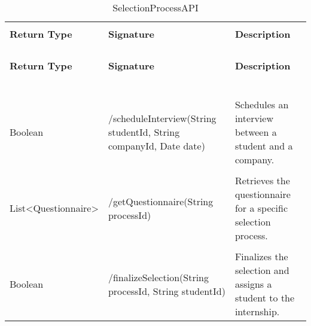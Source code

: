 \begin{longtable}{p{}p{}p{}}
    \caption{SelectionProcessAPI}
    \vspace{0.5em}\\
    \hline
    \vspace{0.5em}\\
    \textbf{Return Type} & \textbf{Signature} & \textbf{Description} \\
    \vspace{0.5em}\\
    \hline
    \vspace{0.5em}\\
    \endfirsthead
    \vspace{0.5em}\\
    \hline
    \vspace{0.5em}\\
    \textbf{Return Type} & \textbf{Signature} & \textbf{Description} \\
    \vspace{0.5em}\\
    \hline
    \vspace{0.5em}\\
    \endhead
    
    \vspace{0.5em}\\
    \hline
    \vspace{0.5em}\\
    \endfoot
    
    \vspace{0.5em}\\
    \hline
    \vspace{0.5em}\\
    \endlastfoot
    
    Boolean &
    /scheduleInterview(String studentId, String companyId, Date date) &
    Schedules an interview between a student and a company. \\
    \vspace{0.5em}\\
    List<Questionnaire> &
    /getQuestionnaire(String processId) &
    Retrieves the questionnaire for a specific selection process. \\
    \vspace{0.5em}\\
    Boolean &
    /finalizeSelection(String processId, String studentId) &
    Finalizes the selection and assigns a student to the internship. \\

\end{longtable}

